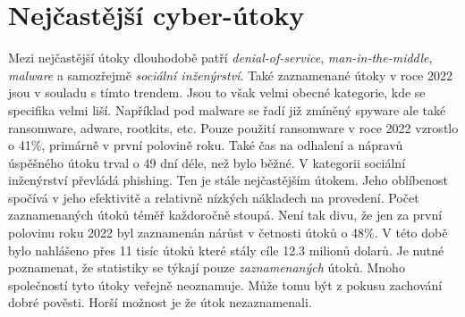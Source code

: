 \section{Nejčastější cyber-útoky}
Mezi nejčastější útoky dlouhodobě patří \textit{denial-of-service}, \textit{man-in-the-middle}, \textit{malware} a samozřejmě \textit{sociální inženýrství}\cite{LI20218176}.
Také zaznamenané útoky v roce 2022 jsou v souladu s tímto trendem.
Jsou to však velmi obecné kategorie, kde se specifika velmi liší.
Například pod malware se řadí již zmíněný spyware ale také ransomware, adware, rootkits, etc.
Pouze použití ransomware v roce 2022 vzrostlo o 41\%, primárně v první polovině roku.
Také čas na odhalení a nápravů úspěšného útoku trval o 49 dní déle, než bylo běžné.
V kategorii sociální inženýrství převládá phishing.
Ten je stále nejčastějším útokem.
Jeho oblíbenost spočívá v jeho efektivitě a relativně nízkých nákladech na provedení.
Počet zaznamenaných útoků téměř každoročně stoupá\cite{moje_bakalarka}.
Není tak divu, že jen za první polovinu roku 2022 byl zaznamenán nárůst v četnosti útoků o 48\%.
V této době bylo nahlášeno přes 11 tisíc útoků které stály cíle 12.3 milionů dolarů.
Je nutné poznamenat, že statistiky se týkají pouze \textit{zaznamenaných} útoků.
Mnoho společností tyto útoky veřejně neoznamuje.
Může tomu být z pokusu zachování dobré pověsti.
Horší možnost je že útok nezaznamenali.\cite{securityintelligence_most_common_2022_attacks}

